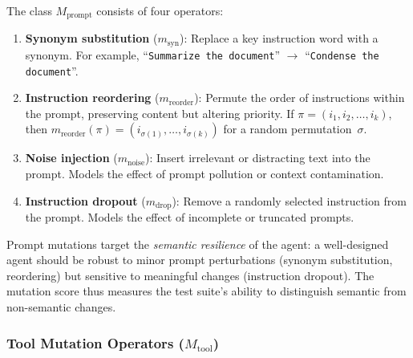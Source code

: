 \begin{definition}
\label{def:prompt-mutations}
The class $M_{\text{prompt}}$ consists of four operators:
\begin{enumerate}[leftmargin=*]
  \item \textbf{Synonym substitution} ($m_{\text{syn}}$): Replace a key
    instruction word with a synonym. For example,
    ``\texttt{Summarize the document}'' $\to$
    ``\texttt{Condense the document}''.

  \item \textbf{Instruction reordering} ($m_{\text{reorder}}$): Permute
    the order of instructions within the prompt, preserving content but
    altering priority. If $\pi = (i_1, i_2, \ldots, i_k)$, then
    $m_{\text{reorder}}(\pi) = (i_{\sigma(1)}, \ldots,
    i_{\sigma(k)})$ for a random permutation~$\sigma$.

  \item \textbf{Noise injection} ($m_{\text{noise}}$): Insert irrelevant
    or distracting text into the prompt. Models the effect of prompt
    pollution or context contamination.

  \item \textbf{Instruction dropout} ($m_{\text{drop}}$): Remove a
    randomly selected instruction from the prompt. Models the effect of
    incomplete or truncated prompts.
\end{enumerate}
\end{definition}

\begin{remark}
Prompt mutations target the \emph{semantic resilience} of the agent: a
well-designed agent should be robust to minor prompt perturbations
(synonym substitution, reordering) but sensitive to meaningful changes
(instruction dropout). The mutation score thus measures the test suite's
ability to distinguish semantic from non-semantic changes.
\end{remark}

\subsubsection{Tool Mutation Operators ($M_{\text{tool}}$)}
\label{sec:mutation:tool}

